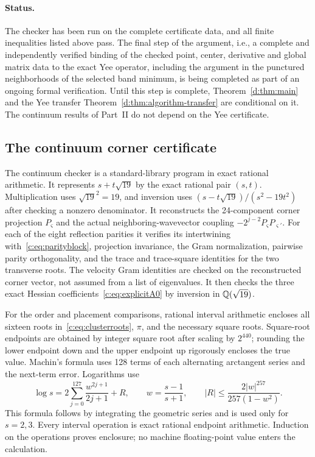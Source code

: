 \paragraph{Status.} The checker has been run on the complete certificate data,
and all finite inequalities listed above pass. The final step of the argument,
i.e., a complete and independently verified binding of the checked point,
center, derivative and global matrix data to the exact Yee operator, including
the argument in the punctured neighborhoods of the selected band minimum, is
being completed as part of an ongoing formal verification. Until this step is
complete, Theorem~\ref{d:thm:main} and the Yee transfer
Theorem~\ref{d:thm:algorithm-transfer} are conditional on it. The continuum
results of Part~II do not depend on the Yee certificate.

\subsection{The continuum corner certificate}\label{c:app:certificate}

The continuum checker is a standard-library program in exact rational
arithmetic. It represents $s+t\sqrt{19}$ by the exact rational pair
$(s,t)$. Multiplication uses $\sqrt{19}^2=19$, and inversion uses
$(s-t\sqrt{19})/(s^2-19t^2)$ after checking a nonzero denominator.
It reconstructs the 24-component corner projection $P_\varsigma$ and the
actual neighboring-wavevector coupling $-2^{j-2}P_\varsigma P_{\varsigma'}$.
For each of the eight reflection parities it verifies its
intertwining with~\eqref{c:eq:parityblock}, projection invariance,
the Gram normalization, pairwise parity orthogonality, and the
trace and trace-square identities
for the two transverse roots. The velocity Gram identities are
checked on the reconstructed corner vector, not assumed from a
list of eigenvalues. It then checks the three exact Hessian
coefficients~\eqref{c:eq:explicitA0} by inversion in
$\mathbb Q(\sqrt{19})$.

For the order and placement comparisons, rational interval
arithmetic encloses all sixteen roots in~\eqref{c:eq:clusterroots},
$\pi$, and the necessary square roots. Square-root endpoints are
obtained by integer square root after scaling by $2^{440}$;
rounding the lower endpoint down and the upper endpoint up
rigorously encloses the true value. Machin's formula uses 128 terms
of each alternating arctangent series and the next-term error.
Logarithms use
\[
 \log s=2\sum_{j=0}^{127}\frac{w^{2j+1}}{2j+1}+R,
 \qquad w=\frac{s-1}{s+1},\qquad
 |R|\le\frac{2|w|^{257}}{257(1-w^2)}.
\]
This formula follows by integrating the geometric series and is
used only for $s=2,3$. Every interval operation is exact rational
endpoint arithmetic. Induction on the operations proves enclosure;
no machine floating-point value enters the calculation.

